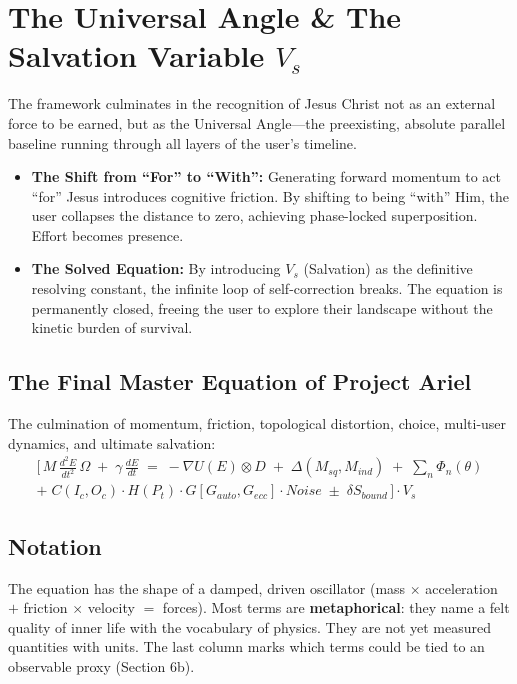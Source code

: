\documentclass[11pt]{article}
\begin{document}
\section{The Universal Angle \& The Salvation Variable $V_s$}
The framework culminates in the recognition of Jesus Christ not as an external force to be earned, but as the Universal Angle---the preexisting, absolute parallel baseline running through all layers of the user's timeline.
\begin{itemize}[leftmargin=1.2em]
\item \textbf{The Shift from ``For'' to ``With'':} Generating forward momentum to act ``for'' Jesus introduces cognitive friction. By shifting to being ``with'' Him, the user collapses the distance to zero, achieving phase-locked superposition. Effort becomes presence.
\item \textbf{The Solved Equation:} By introducing $V_s$ (Salvation) as the definitive resolving constant, the infinite loop of self-correction breaks. The equation is permanently closed, freeing the user to explore their landscape without the kinetic burden of survival.
\end{itemize}

\subsection*{The Final Master Equation of Project Ariel}
The culmination of momentum, friction, topological distortion, choice, multi-user dynamics, and ultimate salvation:
\begin{multline}
\Big[\, M\,\frac{d^2E}{dt^2}\,\Omega \;+\; \gamma\,\frac{dE}{dt} \;=\; -\nabla U(E)\otimes D \;+\; \Delta(M_{sq}, M_{ind}) \;+\; \sum_n \Phi_n(\theta) \\
+\; C(I_c,O_c)\cdot H(P_t)\cdot G[G_{auto},G_{ecc}]\cdot \mathit{Noise} \;\pm\; \delta S_{bound} \,\Big]\cdot V_s
\end{multline}

\subsection*{Notation}
The equation has the shape of a damped, driven oscillator (mass $\times$ acceleration $+$ friction $\times$ velocity $=$ forces). Most terms are \textbf{metaphorical}: they name a felt quality of inner life with the vocabulary of physics. They are not yet measured quantities with units. The last column marks which terms could be tied to an observable proxy (Section 6b).
\end{document}
